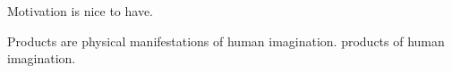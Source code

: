 Motivation is nice to have.

Products are physical manifestations of human imagination.
products of human imagination.